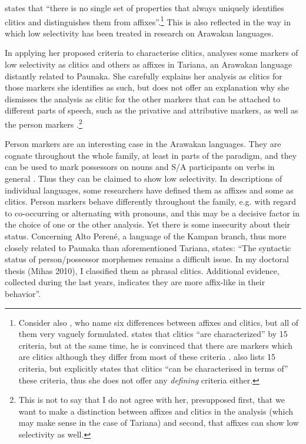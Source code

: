 \citet[277]{Haspelmath2015} states that “there is no single set of properties that always uniquely identifies clitics and distinguishes them from affixes”.\footnote{Consider also \citet[503--504]{ZwickyPullum1983}, who name six differences between affixes and clitics, but all of them very vaguely formulated. \citet[52]{Sadock1991} states that clitics “are characterized” by 15 criteria, but at the same time, he is convinced that there are markers which are clitics although they differ from most of these criteria \citep[55]{Sadock1991}. \citet[43]{Aikhenvald2003b} also lists 15 criteria, but explicitly states that clitics “can be characterised in terms of” these criteria, thus she does not offer any \textit{defining} criteria either.} This is also reflected in the way in which low selectivity has been treated in research on Arawakan languages.

In applying her proposed criteria to characterise clitics, \citet[]{Aikhenvald2003b} analyses some markers of low selectivity as clitics and others as affixes in Tariana, an Arawakan language distantly related to Paunaka. She carefully explains her analysis as clitics for those markers she identifies as such, but does not offer an explanation why she dismisses the analysis as clitic for the other markers that can be attached to different parts of speech, such as the privative and attributive markers, as well as the person markers \citep[73]{Aikhenvald2003b}.\footnote{This is not to say that I do not agree with her, presupposed first, that we want to make a distinction between affixes and clitics in the analysis (which may make sense in the case of Tariana) and second, that affixes can show low selectivity as well.}

Person markers are an interesting case in the Arawakan languages. They are cognate throughout the whole family, at least in parts of the paradigm, and they can be used to mark possessors on nouns and S/A participants on verbs in general \citep[]{Danielsen2014}. Thus they can be claimed to show low selectivity. In descriptions of individual languages, some researchers have defined them as affixes and some as clitics. Person markers behave differently throughout the family, e.g. with regard to co-occurring or alternating with pronouns, and this may be a decisive factor in the choice of one or the other analysis. Yet there is some insecurity about their status. Concerning Alto Perené, a language of the Kampan branch, thus more closely related to Paunaka than aforementioned Tariana, \citet[101]{Mihas2015} states: “The syntactic status of person/possessor morphemes remains a difficult issue. In my doctoral thesis (Mihas 2010), I classified them as phrasal clitics. Additional evidence, collected during the last years, indicates they are more affix-like in their behavior”. %

